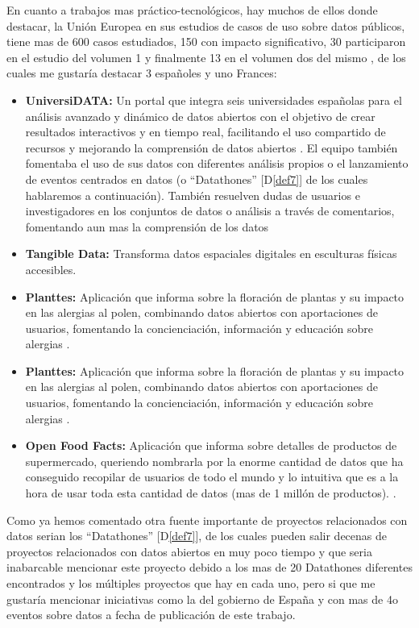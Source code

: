 	En cuanto a trabajos mas práctico-tecnológicos, hay muchos de ellos donde destacar, la Unión Europea en sus estudios de casos de uso sobre datos públicos, tiene mas de 600 casos estudiados, 150 con impacto significativo, 30 participaron en el estudio del volumen 1 \citep{UseCaseObservatory2022V1} y finalmente 13 en el volumen dos del mismo \citep{UseCaseObservatory2024V2}, de los cuales me gustaría destacar 3 españoles y uno Frances:
	\begin{itemize}
		\item \textbf{UniversiDATA:} Un portal que integra seis universidades españolas para el análisis avanzado y dinámico de datos abiertos con el objetivo de crear resultados interactivos y en tiempo real, facilitando el uso compartido de recursos y mejorando la comprensión de datos abiertos \citep{UniversiDATA}. El equipo también fomentaba el uso de sus datos con diferentes análisis propios \citep{UniversiDATAAnalisis} o el lanzamiento de eventos centrados en datos (o ``Datathones'' [D\ref{def7}] \citep{UniversiDATADatathon} de los cuales hablaremos a continuación). También resuelven dudas de usuarios e investigadores en los conjuntos de datos o análisis a través de comentarios, fomentando aun mas la comprensión de los datos 
		\item \textbf{Tangible Data:} Transforma datos espaciales digitales en esculturas físicas accesibles.
		\item \textbf{Planttes:} Aplicación que informa sobre la floración de plantas y su impacto en las alergias al polen, combinando datos abiertos con aportaciones de usuarios, fomentando la concienciación, información y educación sobre alergias \citep{PlanttesDataAPP}.
		\item \textbf{Planttes:} Aplicación que informa sobre la floración de plantas y su impacto en las alergias al polen, combinando datos abiertos con aportaciones de usuarios, fomentando la concienciación, información y educación sobre alergias \citep{PlanttesDataAPP}.
		\item \textbf{Open Food Facts:} Aplicación que informa sobre detalles de productos de supermercado, queriendo nombrarla por la enorme cantidad de datos que ha conseguido recopilar de usuarios de todo el mundo y lo intuitiva que es a la hora de usar toda esta cantidad de datos (mas de 1 millón de productos). \citep{OpenFoodFactsDataAPP}.
	\end{itemize}
	
	Como ya hemos comentado otra fuente importante de proyectos relacionados con datos serian los ``Datathones'' [D\ref{def7}], de los cuales pueden salir decenas de proyectos relacionados con datos abiertos en muy poco tiempo y que seria inabarcable mencionar este proyecto debido a los mas de 20 Datathones diferentes encontrados y los múltiples proyectos que hay en cada uno, pero si que me gustaría mencionar iniciativas como la del gobierno de España \citep{EventosDatosAbiertosGOB} y \citep{EventosDatathonGOB} con mas de 4o eventos sobre datos a fecha de publicación de este trabajo.
	
